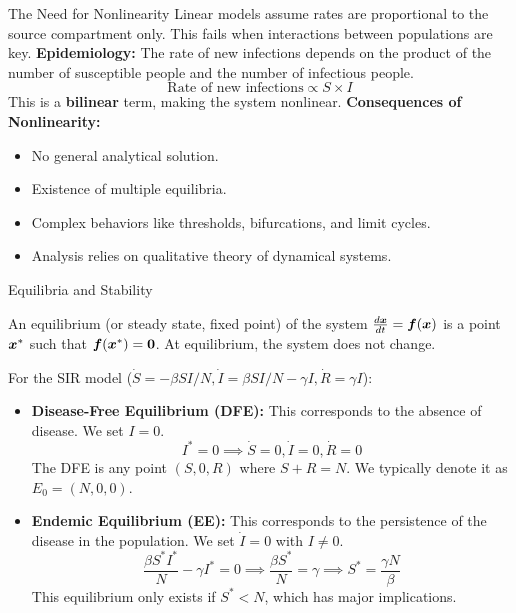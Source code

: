 \documentclass[aspectratio=169]{beamer}\usepackage[]{graphicx}\usepackage[]{xcolor}
\begin{document}
\begin{frame}{The Need for Nonlinearity}
    Linear models assume rates are proportional to the source compartment only. This fails when interactions between populations are key.
    \vfill
    \textbf{Epidemiology:} The rate of new infections depends on the product of the number of susceptible people and the number of infectious people.
    $$ \text{Rate of new infections} \propto S \times I $$
    This is a \textbf{bilinear} term, making the system nonlinear.
    \vfill
    \textbf{Consequences of Nonlinearity:}
    \begin{itemize}
        \item No general analytical solution.
        \item Existence of multiple equilibria.
        \item Complex behaviors like thresholds, bifurcations, and limit cycles.
        \item Analysis relies on qualitative theory of dynamical systems.
    \end{itemize}
\end{frame}

\begin{frame}{Equilibria and Stability}
    \begin{definition}[Equilibrium]
        An equilibrium (or steady state, fixed point) of the system $\frac{d\bm{x}}{dt} = \bm{f}(\bm{x})$ is a point $\bm{x}^*$ such that $\bm{f}(\bm{x}^*) = \bm{0}$. At equilibrium, the system does not change.
    \end{definition}
    \vfill
    For the SIR model ($\dot{S}=-\beta SI/N, \dot{I}=\beta SI/N - \gamma I, \dot{R}=\gamma I$):
    \begin{itemize}
        \item \textbf{Disease-Free Equilibrium (DFE):}
        This corresponds to the absence of disease. We set $I=0$.
        $$ I^* = 0 \implies \dot{S}=0, \dot{I}=0, \dot{R}=0 $$
        The DFE is any point $(S, 0, R)$ where $S+R=N$. We typically denote it as $E_0 = (N, 0, 0)$.
        \item \textbf{Endemic Equilibrium (EE):}
        This corresponds to the persistence of the disease in the population. We set $\dot{I}=0$ with $I \neq 0$.
        $$ \frac{\beta S^* I^*}{N} - \gamma I^* = 0 \implies \frac{\beta S^*}{N} = \gamma \implies S^* = \frac{\gamma N}{\beta} $$
        This equilibrium only exists if $S^* < N$, which has major implications.
    \end{itemize}
\end{frame}
\end{document}
